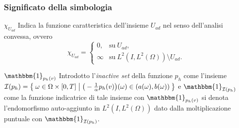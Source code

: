 \documentclass{beamer}
\theoremstyle{definition}
\theoremstyle{remark}
\theoremstyle{plain}
\theoremstyle{definition}
\begin{document}
\begin{frame}
\frametitle{Significato della simbologia}
\begin{block}{$ \chi_{U_{ad}} $}
Indica la funzione caratteristica dell'insieme $ U_{ad} $ nel senso dell'analisi convessa, ovvero
\begin{equation}
\chi_{U_{ad}}=
\begin{cases}
0,        &\text{su} \ U_{ad},\\
\infty   &\text{su} \ L^2(I,L^2(\Omega))\setminus U_{ad}.
\end{cases}
\end{equation}
\end{block}
\begin{block}{$ \mathbbm{1}_{p_h(v)} $}
Introdotto l'\textit{inactive set} della funzione $ p_h $ come l'insieme $ \mathcal{I}(p_h)=\Set{\omega\in \Omega\times [0,T] | \big( -\frac{1}{\alpha}p_h(v)\big)(\omega)\in (a(\omega),b(\omega))} $ e $ \mathbbm{1}_{\mathcal{I}(p_h)} $ come la funzione indicatrice di tale insieme
con $ \mathbbm{1}_{p_h(v)} $ si denota l'endomorfismo auto-aggiunto in $ L^2(I,L^2(\Omega)) $ dato dalla moltiplicazione puntuale con $ \mathbbm{1}_{\mathcal{I}(p_h)} $. 
\end{block}

\end{frame}
\end{document}
